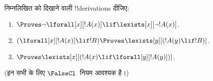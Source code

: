 \documentclass[../../../include/open-logic-section]{subfiles}
\begin{document}
\begin{prob}
निम्नलिखित को दिखाने वाली !!{derivation}s दीजिए:
\begin{enumerate}
\item $\Proves \lnot\lforall[x][!A(x)] \lif \lexists[x][\lnot!A(x)]$.
\item $(\lforall[x][!A(x)] \lif !B) \Proves \lexists[y][(!A(y) \lif !B)]$.
\item $\Proves \lexists[x][(!A(x) \lif \lforall[y][!A(y)])]$.
\end{enumerate}
(इन सभी के लिए $\FalseCl$~नियम आवश्यक है।)
\end{prob}
\end{document}
